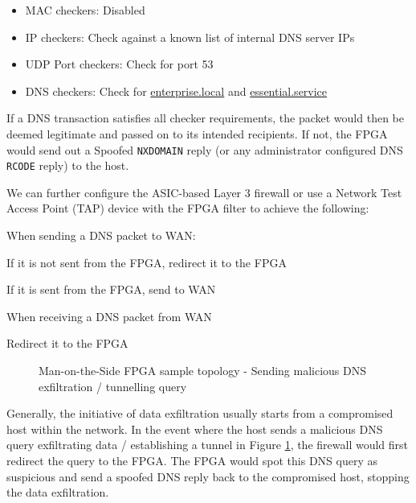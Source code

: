 \documentclass[a4paper]{report}
\newcommand{\code}{\texttt}
\newcommand{\SubItem}[1]{
    {\setlength\itemindent{15pt} \item[-] #1}
}
\begin{document}
\begin{itemize}
    \item MAC checkers: Disabled
    \item IP checkers: Check against a known list of internal DNS server IPs
    \item UDP Port checkers: Check for port 53
    \item DNS checkers: Check for \url{enterprise.local} and \url{essential.service}
\end{itemize}

If a DNS transaction satisfies all checker requirements, the packet would then be deemed legitimate and passed on to its intended recipients. If not, the FPGA would send out a Spoofed \code{NXDOMAIN} reply (or any administrator configured DNS \code{RCODE} reply) to the host.

We can further configure the ASIC-based Layer 3 firewall or use a Network Test Access Point (TAP) device with the FPGA filter to achieve the following:

\begin{itemize}
    \item When sending a DNS packet to WAN:
        \SubItem    {If it is not sent from the FPGA, redirect it to the FPGA}
        \SubItem    {If it is sent from the FPGA, send to WAN}
    \item When receiving a DNS packet from WAN
        \SubItem    {Redirect it to the FPGA}
\end{itemize}


\begin{figure}[H]
  \caption{Man-on-the-Side FPGA sample topology - Sending malicious DNS exfiltration / tunnelling query}
  \label{fig:man-on-the-side-FPGA-send-malicious}
\end{figure}

Generally, the initiative of data exfiltration usually starts from a compromised host within the network. In the event where the host sends a malicious DNS query exfiltrating data / establishing a tunnel in Figure \ref{fig:man-on-the-side-FPGA-send-malicious}, the firewall would first redirect the query to the FPGA. The FPGA would spot this DNS query as suspicious and send a spoofed DNS reply back to the compromised host, stopping the data exfiltration. 
\end{document}
